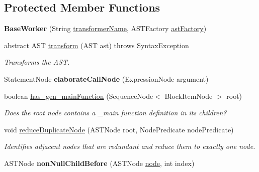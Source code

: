 \subsection*{Protected Member Functions}
\begin{DoxyCompactItemize}
\item 
\hypertarget{classedu_1_1udel_1_1cis_1_1vsl_1_1civl_1_1transform_1_1common_1_1BaseWorker_a941e4476972b2f2fde7dea261b62d53e}{}{\bfseries Base\+Worker} (String \hyperlink{classedu_1_1udel_1_1cis_1_1vsl_1_1civl_1_1transform_1_1common_1_1BaseWorker_ac0c58f181ddacf06a1b997857d8641ab}{transformer\+Name}, A\+S\+T\+Factory \hyperlink{classedu_1_1udel_1_1cis_1_1vsl_1_1civl_1_1transform_1_1common_1_1BaseWorker_a44812bb476e4511fb6ca29a808427186}{ast\+Factory})\label{classedu_1_1udel_1_1cis_1_1vsl_1_1civl_1_1transform_1_1common_1_1BaseWorker_a941e4476972b2f2fde7dea261b62d53e}

\item 
abstract A\+S\+T \hyperlink{classedu_1_1udel_1_1cis_1_1vsl_1_1civl_1_1transform_1_1common_1_1BaseWorker_a8b55fd46dd0e7f3f55394b7b03bc5db5}{transform} (A\+S\+T ast)  throws Syntax\+Exception
\begin{DoxyCompactList}\small\item\em Transforms the A\+S\+T. \end{DoxyCompactList}\item 
\hypertarget{classedu_1_1udel_1_1cis_1_1vsl_1_1civl_1_1transform_1_1common_1_1BaseWorker_af43dca4f3c3e1bcbf4ea97c761374690}{}Statement\+Node {\bfseries elaborate\+Call\+Node} (Expression\+Node argument)\label{classedu_1_1udel_1_1cis_1_1vsl_1_1civl_1_1transform_1_1common_1_1BaseWorker_af43dca4f3c3e1bcbf4ea97c761374690}

\item 
boolean \hyperlink{classedu_1_1udel_1_1cis_1_1vsl_1_1civl_1_1transform_1_1common_1_1BaseWorker_a99f0b8cc5d320eac4a1d52446d0181f3}{has\+\_\+gen\+\_\+main\+Function} (Sequence\+Node$<$ Block\+Item\+Node $>$ root)
\begin{DoxyCompactList}\small\item\em Does the root node contains a \+\_\+main function definition in its children? \end{DoxyCompactList}\item 
void \hyperlink{classedu_1_1udel_1_1cis_1_1vsl_1_1civl_1_1transform_1_1common_1_1BaseWorker_a0f5bccabd2ba03b77c0bc9f2b427ee8b}{reduce\+Duplicate\+Node} (A\+S\+T\+Node root, Node\+Predicate node\+Predicate)
\begin{DoxyCompactList}\small\item\em Identifies adjacent nodes that are redundant and reduce them to exactly one node. \end{DoxyCompactList}\item 
\hypertarget{classedu_1_1udel_1_1cis_1_1vsl_1_1civl_1_1transform_1_1common_1_1BaseWorker_af48235955a11eaf3dc99407cd5bf6060}{}A\+S\+T\+Node {\bfseries non\+Null\+Child\+Before} (A\+S\+T\+Node \hyperlink{structnode}{node}, int index)\label{classedu_1_1udel_1_1cis_1_1vsl_1_1civl_1_1transform_1_1common_1_1BaseWorker_af48235955a11eaf3dc99407cd5bf6060}


\end{DoxyCompactItemize}
